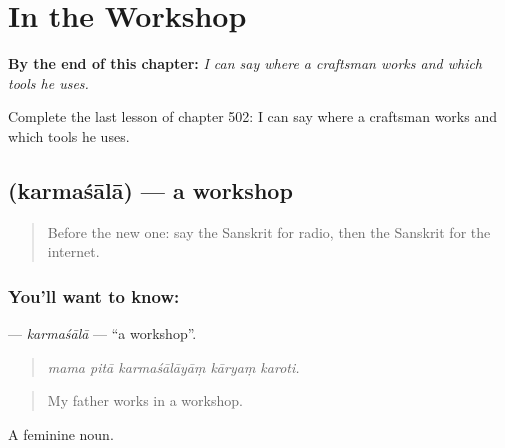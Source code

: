 
\chapter{In the Workshop}
\label{ch:sa-in-the-workshop}

\begin{chapteropening}
\textbf{By the end of this chapter:} \emph{I can say where a craftsman works and which tools he uses.}

Complete the last lesson of chapter 502: I can say where a craftsman works and which tools he uses.
\end{chapteropening}

\section[\texorpdfstring{\sk{कर्मशाला} (karmaśālā)}{कर्मशाला (karmaśālā)}]{ (karmaśālā) — a workshop}

\label{lesson:SA-C502-karmasala}



\begin{quote}
Before the new one: say the Sanskrit for radio, then the Sanskrit for the internet.
\end{quote}

\subsection*{You'll want to know: }
\textbf{} — \emph{karmaśālā} — \textquotedblleft{}a workshop\textquotedblright{}.

\begin{quote}
    
\end{quote}

\begin{quote}
\emph{mama pitā karmaśālāyāṃ kāryaṃ karoti.}
\end{quote}

\begin{quote}
My father works in a workshop.
\end{quote}

A feminine noun.

